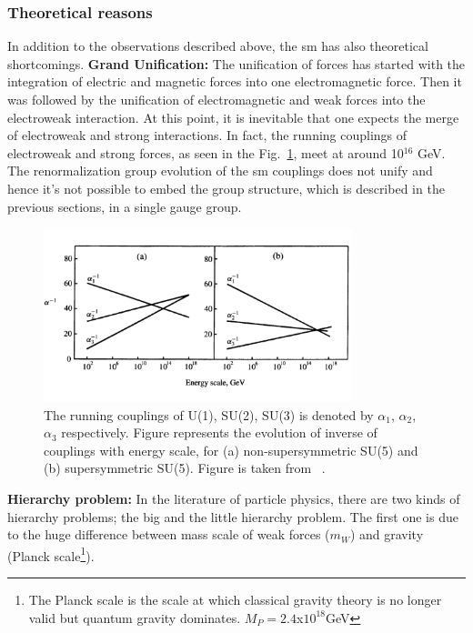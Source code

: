 \subsubsection{Theoretical reasons}
In addition to the observations described above, the \acrshort{sm} has also theoretical shortcomings.
\textbf{Grand Unification:}
The unification of forces has started with the integration of electric and magnetic forces into one electromagnetic force. Then it was followed by the unification of electromagnetic and weak forces into the electroweak interaction. At this point, it is inevitable that one expects the merge of electroweak and strong interactions. In fact, the running couplings of electroweak and strong forces, as seen in the Fig.~\ref{fig:GUT}, meet at around 10$^{16}$ GeV.
The renormalization group evolution of the \acrshort{sm} couplings does not unify and hence it's not possible to embed the group structure, which is described in the previous sections, in a single gauge group.\\
\begin{figure}[!h]
\centering
  \includegraphics[width=0.8\textwidth]{Plots/BSM/GUTBoth.pdf}
  \caption[The running couplings of U(1), SU(2), SU(3)]{ The running couplings of U(1), SU(2), SU(3) is denoted by $\alpha_1$, $\alpha_2$, $\alpha_3$ respectively. Figure represents the evolution of inverse of couplings with energy scale, for (a) non-supersymmetric SU(5) and (b) supersymmetric SU(5). Figure is taken from ~\cite{perkins}.
  }
  \label{fig:GUT}
\end{figure}
\textbf{Hierarchy problem:}
In the literature of particle physics, there are two kinds of hierarchy problems; the big and the little hierarchy problem. The first one is due to the huge difference between mass scale of weak forces ($m_W$) and gravity (Planck scale\footnote{The Planck scale is the scale at which classical gravity theory is no longer valid but quantum gravity dominates. $M_P=2.4$x$10^{18}$GeV}).
